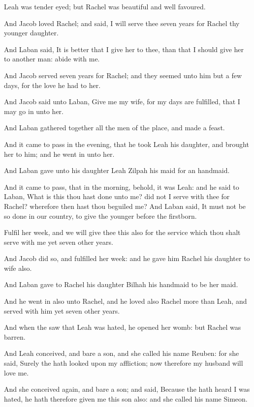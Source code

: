 \verse Leah was tender eyed; but Rachel was beautiful and well favoured.

\verse And Jacob loved Rachel; and said, I will serve thee seven years for Rachel thy younger daughter.

\verse And Laban said, It is better that I give her to thee, than that I should give her to another man: abide with me.

\verse And Jacob served seven years for Rachel; and they seemed unto him but a few days, for the love he had to her.

\verse And Jacob said unto Laban, Give me my wife, for my days are fulfilled, that I may go in unto her.

\verse And Laban gathered together all the men of the place, and made a feast.

\verse And it came to pass in the evening, that he took Leah his daughter, and brought her to him; and he went in unto her.

\verse And Laban gave unto his daughter Leah Zilpah his maid for an handmaid.

\verse And it came to pass, that in the morning, behold, it was Leah: and he said to Laban, What is this thou hast done unto me? did not I serve with thee for Rachel? wherefore then hast thou beguiled me?  \verse And Laban said, It must not be so done in our country, to give the younger before the firstborn.

\verse Fulfil her week, and we will give thee this also for the service which thou shalt serve with me yet seven other years.

\verse And Jacob did so, and fulfilled her week: and he gave him Rachel his daughter to wife also.

\verse And Laban gave to Rachel his daughter Bilhah his handmaid to be her maid.

\verse And he went in also unto Rachel, and he loved also Rachel more than Leah, and served with him yet seven other years.

\verse And when the \LORD saw that Leah was hated, he opened her womb: but Rachel was barren.

\verse And Leah conceived, and bare a son, and she called his name Reuben: for she said, Surely the \LORD hath looked upon my affliction; now therefore my husband will love me.

\verse And she conceived again, and bare a son; and said, Because the \LORD hath heard I was hated, he hath therefore given me this son also: and she called his name Simeon.

